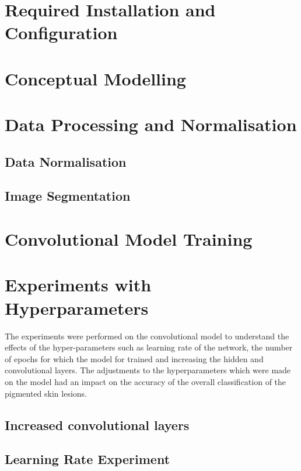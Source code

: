 \section{Required Installation and Configuration}

\pagebreak
\section{Conceptual Modelling}

\section{Data Processing and Normalisation}

\subsection{Data Normalisation}

\pagebreak
\subsection{ Image Segmentation }

\pagebreak
\section{Convolutional Model Training}


\pagebreak
\section{Experiments with Hyperparameters}
The experiments were performed on the convolutional model to understand the effects of the hyper-parameters 
such as learning rate of the network, the number of epochs for which the model for trained and increasing the hidden  
and convolutional layers. The adjustments to the hyperparameters which were made on the model had an impact on the accuracy of the overall classification of the pigmented skin lesions.

\subsection{Increased convolutional layers}


\subsection{Learning Rate Experiment}


